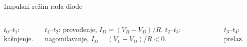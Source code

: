 \begin{frame}[label=10-s004]{Impulsni režim rada diode}
\setlength{\abovedisplayskip}{4pt}\setlength{\belowdisplayskip}{4pt}\setlength{\abovedisplayshortskip}{3pt}\setlength{\belowdisplayshortskip}{3pt}
\begin{columns}[T,onlytextwidth]\centering
\par\vspace{1pt}
\centering \end{columns}\vspace{1pt}
\begin{columns}[T,onlytextwidth]
$t_0$–$t_1$: kašnjenje.\par $t_1$–$t_2$: provođenje, $I_D=(V_H-V_D)/R$.
$t_2$–$t_3$: nagomilavanje, $I_D=(V_L-V_D)/R<0$.\par $t_3$–$t_4$: prelaz.
\end{columns}
\end{frame}
